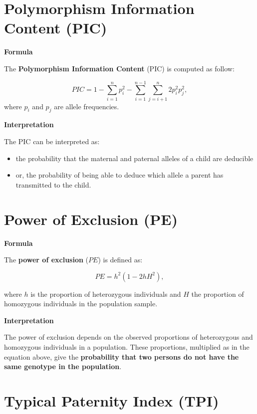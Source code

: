 \documentclass[
]{book}
\begin{document}
\hypertarget{polymorphism-information-content-pic}{%
\section{Polymorphism Information Content (PIC)}\label{polymorphism-information-content-pic}}

\textbf{Formula}

The \textbf{Polymorphism Information Content} (PIC) is computed as follow:

\[
PIC = 1 - \sum_{i=1}^{n} p_i^2 - \sum_{i=1}^{n-1} \sum_{j=i+1}^{n} 2p_i^2p_j^2,
\]
where \(p_i\) and \(p_j\) are allele frequencies.

\textbf{Interpretation}

The PIC can be interpreted as:

\begin{itemize}
\item
  the probability that the maternal and paternal alleles of a child are
  deducible
\item
  or, the probability of being able to deduce which allele a
  parent has transmitted to the child.
\end{itemize}

\hypertarget{power-of-exclusion-pe}{%
\section{Power of Exclusion (PE)}\label{power-of-exclusion-pe}}

\textbf{Formula}

The \textbf{power of exclusion} (\(PE\)) is defined as:

\[
PE = h^2\left(1 - 2hH^2\right),
\]

where \(h\) is the proportion of heterozygous individuals and \(H\) the
proportion of homozygous individuals in the population sample.

\textbf{Interpretation}

The power of exclusion depends on the observed proportions of heterozygous and
homozygous individuals in a population. These proportions, multiplied as in the
equation above, give the \textbf{probability that two persons do not have the same genotype
in the population}.

\hypertarget{typical-paternity-index-tpi}{%
\section{Typical Paternity Index (TPI)}\label{typical-paternity-index-tpi}}
\end{document}
